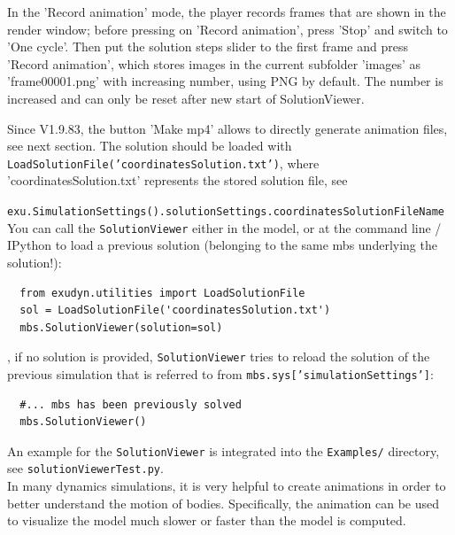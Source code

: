 \item In the 'Record animation' mode, the player records frames that are shown in the render window; before pressing on 'Record animation', press 'Stop' and switch to 'One cycle'. Then put the solution steps slider to the first frame and press 'Record animation', which stores images in the current subfolder 'images' as 'frame00001.png' with increasing number, using PNG by default. The number is increased and can only be reset after new start of SolutionViewer.
\item Since \codeName V1.9.83, the button 'Make mp4' allows to directly generate animation files, see next section.
\ei
The solution should be loaded with
\texttt{LoadSolutionFile('coordinatesSolution.txt')}, where 'coordinatesSolution.txt' represents the stored solution file, 
see 
\bi
  \item \texttt{exu.SimulationSettings().solutionSettings.coordinatesSolutionFileName}
\ei
You can call the \texttt{SolutionViewer} either in the model, or at the command line / IPython to load a previous solution (belonging to the same mbs underlying the solution!):
\pythonstyle\begin{lstlisting}
  from exudyn.utilities import LoadSolutionFile
  sol = LoadSolutionFile('coordinatesSolution.txt')
  mbs.SolutionViewer(solution=sol)
\end{lstlisting}
%
, if no solution is provided, \texttt{SolutionViewer} tries to reload the solution of the previous simulation that is referred to from \texttt{mbs.sys['simulationSettings']}:
\pythonstyle\begin{lstlisting}
  #... mbs has been previously solved
  mbs.SolutionViewer()
\end{lstlisting}
An example for the \texttt{SolutionViewer} is integrated into the \texttt{Examples/} directory, see \texttt{solutionViewerTest.py}. \\

%
In many dynamics simulations, it is very helpful to create animations in order to better understand the motion of bodies. Specifically, the animation can be used to visualize the model much slower or faster than the model is computed.

